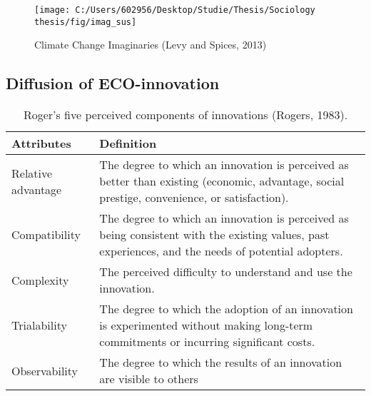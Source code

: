 \documentclass[man,floatsintext]{apa6}
\begin{document}
\begin{figure}

{\centering \texttt{[image: C:/Users/602956/Desktop/Studie/Thesis/Sociology thesis/fig/imag\_sus]} 

}

\caption{ Climate Change Imaginaries (Levy and Spices, 2013) }\label{fig:clim}
\end{figure}

\subsection{Diffusion of
ECO-innovation}\label{diffusion-of-eco-innovation}

\begin{table}[t]

\caption{\label{tab:diff}Roger's five perceived components of innovations (Rogers, 1983).}
\centering
\fontsize{9}{11}\selectfont
\begin{tabular}{>{}l>{\raggedright\arraybackslash}p{30em}}
\toprule
Attributes & Definition\\
\midrule
Relative advantage & The degree to which an innovation is perceived as better than existing (economic,  advantage, social prestige, convenience, or satisfaction).\\
Compatibility & The degree to which an innovation is perceived as being consistent with the existing values, past experiences, and the needs of potential adopters.\\
Complexity & The perceived difficulty to understand and use the innovation.\\
Trialability & The degree to which the adoption of an innovation is experimented without making long-term commitments or incurring significant costs.\\
Observability & The degree to which the results of an innovation are visible to others\\
\bottomrule
\end{tabular}
\end{table}
\end{document}

